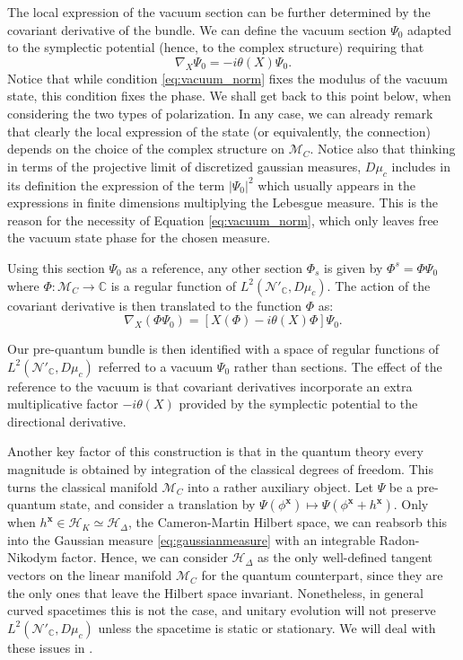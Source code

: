 \documentclass[12pt]{article}%
\begin{document}
The local expression of the vacuum section can be further determined by the covariant derivative of the bundle. We can define the vacuum section $\Psi_0$ adapted to the symplectic potential (hence, to the complex structure) requiring that
\begin{equation}
\label{eq:vacuum}
\nabla_{X}\Psi_0=-i\theta(X)\Psi_0.
\end{equation}
Notice that while condition \eqref{eq:vacuum_norm} fixes the modulus of the vacuum state, this condition fixes the phase.  We shall get back to this point below, when considering the two types of polarization.  In any case, we can already remark that clearly the local expression of the state (or equivalently, the connection) depends on the choice of the complex structure on $\mathcal{M}_C$. 
Notice also that thinking in terms of the projective limit of discretized gaussian measures, $D\mu_c$ includes in its definition the expression of the term $\vert \Psi_0\vert^2$  which usually appears in the expressions in finite dimensions multiplying the Lebesgue measure. This is the reason for the necessity of  Equation \eqref{eq:vacuum_norm}, which only leaves free the vacuum state phase for the chosen measure.



Using this section $\Psi_0$ as a reference, any other section  $\Phi_s$ is given by $\Phi^s=\Phi\Psi_0$ where $\Phi:\mathcal{M}_C\to \mathbb{C}$ is a regular function of $L^2(\mathcal{N}'_\mathbb{C},D\mu_c)$. The action of the covariant derivative is then translated to the function $\Phi$ as:
\begin{equation}
\label{eq:covariantDerivative}
\nabla_X(\Phi\Psi_0)=\left[ X(\Phi)-i\theta(X)\Phi\right]\Psi_0.
\end{equation}



Our pre-quantum bundle is then identified with a space of regular functions of $L^2(\mathcal{N}'_\mathbb{C},D\mu_c)$ referred to a vacuum $\Psi_0$ rather than sections. The effect of the reference to the vacuum is that covariant derivatives incorporate an  extra multiplicative factor $-i\theta(X)$ provided by the symplectic potential to the directional derivative.   

Another key factor of this construction is that in the quantum theory every magnitude is obtained by integration of the classical degrees of freedom. This turns the classical manifold $\mathcal{M}_C$ into a rather auxiliary object. Let $\Psi$ be a pre-quantum state, and consider a translation by $\Psi(\phi^\mathbf{x})\mapsto \Psi(\phi^\mathbf{x}+h^\mathbf{x})$. Only when $h^\mathbf{x}\in \mathcal{H}_K\simeq \mathcal{H}_\Delta$, the Cameron-Martin Hilbert space, we can reabsorb this into the Gaussian measure \eqref{eq:gaussianmeasure} with an integrable Radon-Nikodym factor. Hence, we can consider $\mathcal{H}_\Delta$ as the only well-defined tangent vectors on the linear manifold $\mathcal{M}_C$ for the quantum counterpart, since they are the only ones that leave the Hilbert space invariant. Nonetheless, in general curved spacetimes this is not the case, and unitary evolution will not preserve  $L^2(\mathcal{N}'_\mathbb{C},D\mu_c)$ unless the spacetime is static or stationary.  We will deal with these issues in \cite{alonso2023a}.
\end{document}
